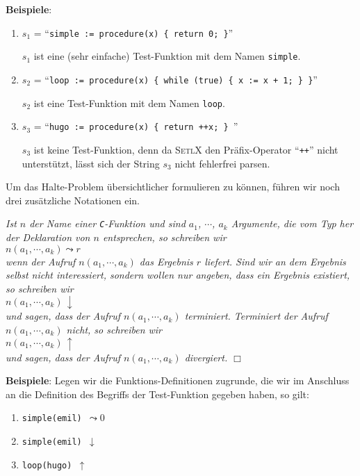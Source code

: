 \noindent
\textbf{Beispiele}:  
\begin{enumerate}
\item $s_1$ = ``{\tt simple := procedure(x) \{ return 0; \}}''

      $s_1$ ist eine (sehr einfache) Test-Funktion mit dem Namen \texttt{simple}.
\item $s_2$ = ``{\tt loop := procedure(x) \{ while (true) \{ x := x + 1; \} \}}''

      $s_2$ ist eine Test-Funktion mit dem Namen \texttt{loop}. 
\item $s_3$ = ``{\tt hugo := procedure(x) \{ return ++x; \} }''

      $s_3$ ist keine Test-Funktion, denn da \textsc{SetlX} den Pr\"afix-Operator
      ``\texttt{++}'' nicht unterst\"utzt, l\"asst sich der String $s_3$  nicht fehlerfrei parsen.
\end{enumerate}
Um das Halte-Problem \"ubersichtlicher formulieren zu k\"onnen, f\"uhren wir noch drei
zus\"atzliche Notationen ein.
\begin{Notation}[$\leadsto$, $\downarrow$, $\uparrow$]
{\em
Ist $n$ der Name einer \texttt{C}-Funktion und sind $a_1$, $\cdots$, $a_k$ Argumente, die
vom Typ her der Deklaration von $n$ entsprechen, so schreiben wir \\[0.3cm]
\hspace*{1.3cm} $n(a_1, \cdots, a_k) \leadsto r$ \\[0.3cm]
wenn der Aufruf $n(a_1, \cdots, a_k)$ das Ergebnis $r$ liefert.  Sind wir an dem Ergebnis
selbst nicht interessiert, sondern wollen nur angeben, dass ein Ergebnis existiert, so
schreiben wir \\[0.3cm]
\hspace*{1.3cm} $n(a_1, \cdots, a_k) \,\downarrow$ \\[0.3cm]
und sagen, dass der Aufruf $n(a_1, \cdots, a_k)$ \emph{terminiert}.
Terminiert der Aufruf $n(a_1, \cdots, a_k)$ nicht, so schreiben wir \\[0.3cm]
\hspace*{1.3cm} $n(a_1, \cdots, a_k) \,\uparrow$ \\[0.3cm]
und sagen, dass der Aufruf $n(a_1, \cdots, a_k)$ \emph{divergiert}.
\hspace*{\fill} $\Box$
}
\end{Notation}

\noindent
\textbf{Beispiele}: Legen wir die Funktions-Definitionen zugrunde, die wir im Anschluss an
die Definition des Begriffs der Test-Funktion gegeben haben, so gilt:
\begin{enumerate}
\item {\tt simple(emil) $\leadsto 0$}
\item {\tt simple(emil) $\downarrow$}
\item {\tt loop(hugo) $\uparrow$}
\end{enumerate}

